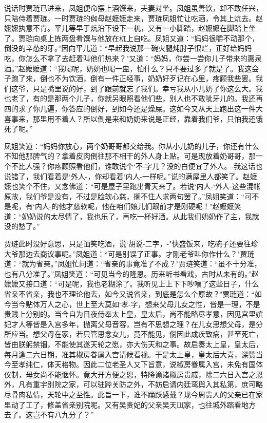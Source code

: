说话时贾琏已进来，凤姐便命摆上酒馔来，夫妻对坐。凤姐虽善饮，却不敢任兴，只陪侍着贾琏。一时贾琏的侞母赵嬷嬷走来，贾琏凤姐忙让吃酒，令其上炕去。赵嬷嬷执意不肯。平儿等早于炕沿下设下一杌，又有一小脚踏，赵嬷嬷在脚踏上坐了。贾琏向桌上拣两盘肴馔与他放在杌上自吃。凤姐又道：“妈妈很嚼不动那个，倒没的辛怂的牙。”因向平儿道：“早起我说那一碗火腿炖肘子很烂，正好给妈妈吃，你怎么不拿了去赶着叫他们热来？"又道：“妈妈，你尝一尝你儿子带来的惠泉酒。”赵嬷嬷道：“我喝呢，奶奶也喝一盅，怕什么？只不要过多了就是了。我这会子跑了来，倒也不为饮酒，倒有一件正经事，奶奶好歹记在心里，疼顾我些罢。我们这爷，只是嘴里说的好，到了跟前就忘了我们。幸亏我从小儿奶了你这么大。我也老了，有的是那两个儿子，你就另眼照看他们些，别人也不敢呲牙儿的。我还再四的求了你几遍，你答应的倒好，到如今还是燥屎。这如今又从天上跑出这一件大喜事来，那里用不着人？所以倒是来和奶奶来说是正经，靠着我们爷，只怕我还饿死了呢。”

凤姐笑道：“妈妈你放心，两个奶哥哥都交给我。你从小儿奶的儿子，你还有什么不知他那脾气的？拿着皮肉倒往那不相干的外人身上贴。可是现放着奶哥哥，那一个不比人强？你疼顾照看他们，谁敢说个`不-字儿？没的白便宜了外人。-我这话也说错了，我们看着是`外人-，你却看着`内人-一样呢。”说的满屋里人都笑了。赵嬷嬷也笑个不住，又念佛道：“可是屋子里跑出青天来了。若说`内人-`外人-这些混帐原故，我们爷是没有，不过是脸软心慈，搁不住人求两句罢了。”凤姐笑道：“可不是呢，有`内人-的他才慈软呢，他在咱们娘儿们跟前才是刚硬呢！"赵嬷嬷笑道：“奶奶说的太尽情了，我也乐了，再吃一杯好酒。从此我们奶奶作了主，我就没的愁了。”

贾琏此时没好意思，只是讪笑吃酒，说`胡说-二字，-"快盛饭来，吃碗子还要往珍大爷那边去商议事呢。”凤姐道：“可是别误了正事。才刚老爷叫你作什么？"贾琏道：“就为省亲。”凤姐忙问道：“省亲的事竟准了不成？"贾琏笑道：“虽不十分准，也有八分准了。”凤姐笑道：“可见当今的隆恩。历来听书看戏，古时从未有的。”赵嬷嬷又接口道：“可是呢，我也老糊涂了。我听见上上下下吵嚷了这些日子，什么省亲不省亲，我也不理论他去，如今又说省亲，到底是怎么个原故？"贾琏道：“如今当今贴体万人之心，世上至大莫如`孝-字，想来父母儿女之性，皆是一理，不是贵贱上分别的。当今自为日夜侍奉太上皇，皇太后，尚不能略尽孝意，因见宫里嫔妃才人等皆是入宫多年，抛离父母音容，岂有不思想之理？在儿女思想父母，是分所应当。想父母在家，若只管思念女儿，竟不能见，倘因此成疾致病，甚至死亡，皆由朕躬禁锢，不能使其遂天轮之愿，亦大伤天和之事。故启奏太上皇，皇太后，每月逢二六日期，准其椒房眷属入宫请候看视。于是太上皇，皇太后大喜，深赞当今至孝纯仁，体天格物。因此二位老圣人又下旨意，说椒房眷属入宫，未免有国体仪制，母女尚不能惬怀。竟大开方便之恩，特降谕诸椒房贵戚，除二六日入宫之恩外，凡有重宇别院之家，可以驻跸关防之外，不妨启请内廷鸾舆入其私第，庶可略尽骨肉私情，天轮中之至性。此旨一下，谁不踊跃感戴？现今周贵人的父亲已在家里动了工了，修盖省亲别院呢。又有吴贵妃的父亲吴天Щ家，也往城外踏看地方去了。这岂不有八九分了？”

